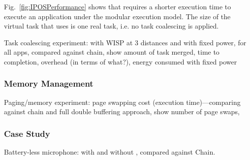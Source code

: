 Fig.~\ref{fig:IPOSPerformance} shows that \sys requires a shorter execution time to execute an application under the modular execution model. The size of the virtual task that \sys uses is one real task, i.e. no task coalescing is applied.

Task coalescing experiment: with WISP at 3 distances and with fixed power, for all apps, compared against chain, show amount of task merged, time to completion, overhead (in terms of what?), energy consumed with fixed power

\subsubsection{Memory Management}
\label{sec:results_memory_management}

Paging/memory experiment: page swapping cost (execution time)---comparing against chain and full double buffering approach, show number of page swaps, 


\subsubsection{Case Study}
\label{sec:case_study}

Battery-less microphone: with \sys and without \sys, compared against Chain.